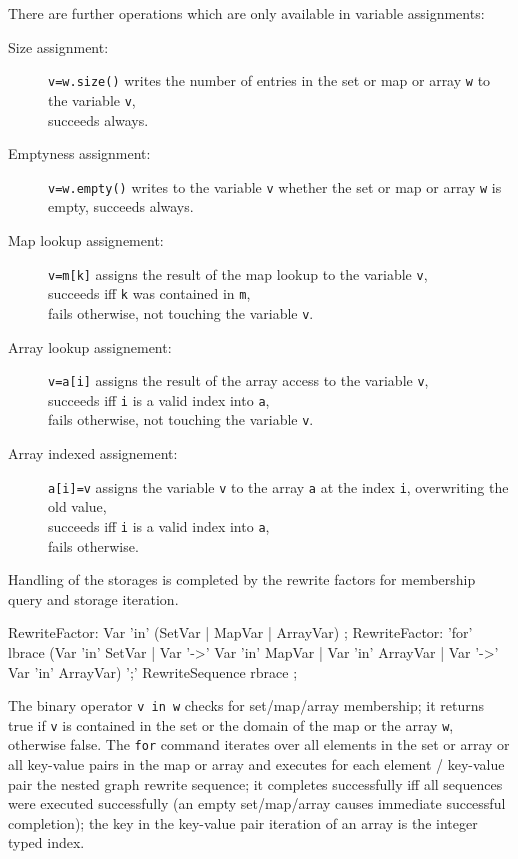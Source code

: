\noindent There are further operations which are only available in variable assignments:

\begin{description}
\item[Size assignment:] \texttt{v=w.size()} writes the number of entries in the set or map or array \texttt{w} to the variable \texttt{v},\\succeeds always.
\item[Emptyness assignment:] \texttt{v=w.empty()} writes to the variable \texttt{v} whether the set or map or array \texttt{w} is empty, succeeds always.
\item[Map lookup assignement:] \texttt{v=m[k]} assigns the result of the map lookup to the variable \texttt{v},\\succeeds iff \texttt{k} was contained in \texttt{m},\\ fails otherwise, not touching the variable \texttt{v}.
\item[Array lookup assignement:] \texttt{v=a[i]} assigns the result of the array access to the variable \texttt{v},\\succeeds iff \texttt{i} is a valid index into \texttt{a},\\ fails otherwise, not touching the variable \texttt{v}.
\item[Array indexed assignement:] \texttt{a[i]=v} assigns the variable \texttt{v} to the array \texttt{a} at the index \texttt{i}, overwriting the old value,\\succeeds iff \texttt{i} is a valid index into \texttt{a},\\ fails otherwise.
\end{description}

\noindent Handling of the storages is completed by the rewrite factors for membership query and storage iteration.

\begin{rail}
  RewriteFactor:
    Var 'in' (SetVar | MapVar | ArrayVar)
    ;
  RewriteFactor:
    'for' lbrace (Var 'in' SetVar | Var '->' Var 'in' MapVar | Var 'in' ArrayVar | Var '->' Var 'in' ArrayVar) ';' RewriteSequence rbrace
    ;
\end{rail}

The binary operator \texttt{v in w} checks for set/map/array membership; it returns true if \texttt{v} is contained in the set or the domain of the map or the array \texttt{w}, otherwise false.
The \texttt{for} command iterates over all elements in the set or array or all key-value pairs in the map or array and executes for each element / key-value pair the nested graph rewrite sequence; it completes successfully iff all sequences were executed successfully (an empty set/map/array causes immediate successful completion); the key in the key-value pair iteration of an array is the integer typed index.

